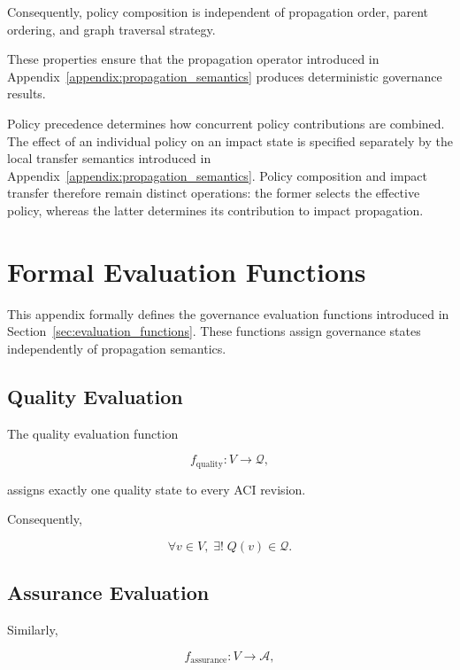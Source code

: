\documentclass[10pt]{article}
\begin{document}
Consequently, policy composition is independent of propagation order, parent ordering, and graph traversal strategy.

These properties ensure that the propagation operator introduced in Appendix~\ref{appendix:propagation_semantics} produces deterministic governance results.

Policy precedence determines how concurrent policy contributions are combined.
The effect of an individual policy on an impact state is specified separately
by the local transfer semantics introduced in
Appendix~\ref{appendix:propagation_semantics}. Policy composition and impact
transfer therefore remain distinct operations: the former selects the effective
policy, whereas the latter determines its contribution to impact propagation.

\section{Formal Evaluation Functions}
\label{appendix:evaluation_functions}

This appendix formally defines the governance evaluation functions introduced in Section~\ref{sec:evaluation_functions}. These functions assign governance states independently of propagation semantics.

\subsection{Quality Evaluation}

The quality evaluation function

\begin{equation}
	f_{\mathrm{quality}} : V \rightarrow \mathcal{Q},
	\label{eq:quality_function}
\end{equation}

assigns exactly one quality state to every ACI revision.

Consequently,

\begin{equation}
	\forall v\in V,\;
	\exists!\;
	Q(v)\in\mathcal{Q}.
	\label{eq:quality_total}
\end{equation}

\subsection{Assurance Evaluation}

Similarly,

\begin{equation}
	f_{\mathrm{assurance}} : V \rightarrow \mathcal{A},
	\label{eq:assurance_function}
\end{equation}
\end{document}

